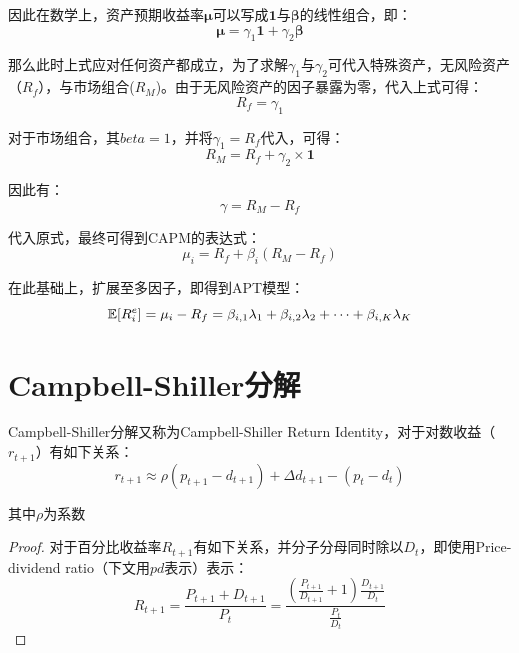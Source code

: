 \documentclass[11pt]{article}
\begin{document}
\begin{appendices}
因此在数学上，资产预期收益率$\bm{\mu}$可以写成$\bm{1}$与$\bm{\beta}$的线性组合，即：
\begin{equation*}
    \bm{\mu} = \gamma_1 \bm{1} + \gamma_2 \bm{\beta}
\end{equation*}

那么此时上式应对任何资产都成立，为了求解$\gamma_1$与$\gamma_2$可代入特殊资产，无风险资产（$R_f$），与市场组合($R_M$)。由于无风险资产的因子暴露为零，代入上式可得：
\begin{equation*}
    R_f = \gamma_1
\end{equation*}

对于市场组合，其$beta=1$，并将$\gamma_1 = R_f$代入，可得：
\begin{equation*}
    R_M = R_f + \gamma_2 \times \bm{1}
\end{equation*}

因此有：
\begin{equation*}
    \gamma = R_M - R_f
\end{equation*}

代入原式，最终可得到CAPM的表达式：
\begin{equation*}
    \mu_i = R_f + \beta_i(R_M - R_f)
\end{equation*}

在此基础上，扩展至多因子，即得到APT模型：
\begin{equation*}
    \mathbb{E}[R_{i}^{e}] = \mu_i - R_f = \beta_{i,1} \lambda_1 + \beta_{i,2} \lambda_2 + \dots + \beta_{i,K} \lambda_K
\end{equation*}

\section{Campbell-Shiller分解}

Campbell-Shiller分解又称为Campbell-Shiller Return Identity，对于对数收益（$r_{t+1}$）有如下关系：
\begin{equation*}
    r_{t+1} \approx \rho(p_{t+1} - d_{t+1}) + \Delta d_{t+1} - (p_t - d_t)
\end{equation*}

其中$\rho$为系数

\begin{proof}
    对于百分比收益率$R_{t+1}$有如下关系，并分子分母同时除以$D_t$，即使用Price-dividend ratio（下文用$pd$表示）表示：
    \begin{equation*}
        R_{t+1} = \frac{P_{t+1} + D_{t+1}}{P_t} = \frac{\left( \frac{P_{t+1}}{D_{t+1}} + 1\right) \frac{D_{t+1}}{D_t}}{\frac{P_t}{D_t}}
    \end{equation*}


\end{proof}
\end{appendices}
\end{document}
